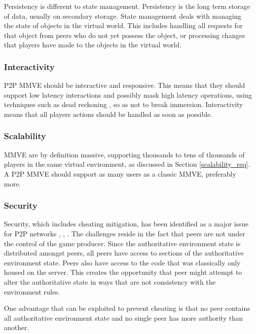 Persistency is different to state management. Persistency is the long term storage of data, usually on secondary storage. State management deals with managing the state of objects in the virtual world. This includes handling all requests for that object from peers who do not yet possess the object, or processing changes that players have made to the objects in the virtual world.

\subsubsection{Interactivity}

P2P MMVE should be interactive and responsive. This means that they should support low latency interactions and possibly mask high latency operations, using techniques such as dead reckoning \cite{cheat_proof_playout}, so as not to break immersion. Interactivity means that all players actions should be handled as soon as possible.

\subsubsection{Scalability}

MMVE are by definition massive, supporting thousands to tens of thousands of players in the same virtual environment, as discussed in Section \ref{scalability_req}. A P2P MMVE should support as many users as a classic MMVE, preferably more.

\subsubsection{Security}

Security, which includes cheating mitigation, has been identified as a major issue for P2P networks \cite{knutsson_p2p_first}, \cite{challenges_p2p_gaming}, \cite{cheat_proof_event_ordering}. The challenges reside in the fact that peers are not under the control of the game producer. Since the authoritative environment state is distributed amongst peers, all peers have access to sections of the authoritative environment state. Peers also have access to the code that was classically only housed on the server. This creates the opportunity that peer might attempt to alter the authoritative state in ways that are not consistency with the environment rules.

One advantage that can be exploited to prevent cheating is that no peer contains all authoritative environment state and no single peer has more authority than another.

